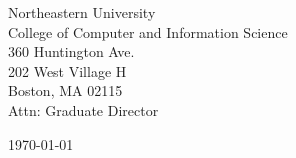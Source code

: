 \begin{minipage}{0.49\textwidth}
\begin{flushleft}
\noindent
Northeastern University \\
College of Computer and Information Science \\
360 Huntington Ave. \\
202 West Village H \\
Boston, MA 02115 \\
Attn: Graduate Director
\end{flushleft}
\end{minipage}
\begin{minipage}{0.47\textwidth}
\begin{flushright}
\today
\end{flushright}
\end{minipage} \\

\newcommand{\univ}{Northeastern University}
\newcommand{\univshort}{Northeastern}
\newcommand{\degree}{Ph.D.}
\newcommand{\dept}{Computer Science}
